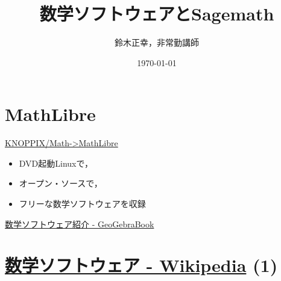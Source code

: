 \documentclass[dvipdfmx,11pt]{jarticle}
\author{鈴木正幸，非常勤講師}
\date{\today}
\title{数学ソフトウェアとSagemath}
\begin{document}
\maketitle

\section{MathLibre}
\label{sec:org8a8d7d4}

\href{https://www.geogebra.org/m/hShSTr6e}{KNOPPIX/Math->MathLibre} 

\begin{itemize}
\item DVD起動Linuxで，

\item オープン・ソースで，

\item フリーな数学ソフトウェアを収録
\end{itemize}

\href{https://www.geogebra.org/m/hShSTr6e}{数学ソフトウェア紹介 - GeoGebraBook}


\section{\href{https://ja.wikipedia.org/wiki/\%E6\%95\%B0\%E5\%AD\%A6\%E3\%82\%BD\%E3\%83\%95\%E3\%83\%88\%E3\%82\%A6\%E3\%82\%A7\%E3\%82\%A2}{数学ソフトウェア - Wikipedia} (1)}
\label{sec:org4a25515}
\end{document}
